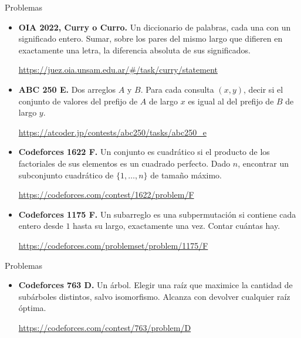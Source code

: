 \begin{frame}[fragile]{Problemas}
  \begin{itemize}
    \item \textbf{OIA 2022, Curry o Curro.}
      Un diccionario de palabras, cada una con un significado entero.
      Sumar, sobre los pares del mismo largo que difieren en exactamente una letra, la diferencia absoluta de sus significados.

      {\footnotesize \url{https://juez.oia.unsam.edu.ar/#/task/curry/statement}}

    \item \textbf{ABC 250 E.}
      Dos arreglos \(A\) y \(B\).
      Para cada consulta \((x, y)\), decir si el conjunto de valores del prefijo de \(A\) de largo \(x\) es igual al del prefijo de \(B\) de largo \(y\).

      {\footnotesize \url{https://atcoder.jp/contests/abc250/tasks/abc250_e}}

    \item \textbf{Codeforces 1622 F.}
      Un conjunto es cuadrático si el producto de los factoriales de sus elementos es un cuadrado perfecto.
      Dado \(n\), encontrar un subconjunto cuadrático de \(\{1,\ldots,n\}\) de tamaño máximo.

      {\footnotesize \url{https://codeforces.com/contest/1622/problem/F}}

    \item \textbf{Codeforces 1175 F.}
      Un subarreglo es una subpermutación si contiene cada entero desde \(1\) hasta su largo, exactamente una vez.
      Contar cuántas hay.

      {\footnotesize \url{https://codeforces.com/problemset/problem/1175/F}}
  \end{itemize}
\end{frame}

\begin{frame}{Problemas}
  \begin{itemize}
    \item \textbf{Codeforces 763 D.}
      Un árbol.
      Elegir una raíz que maximice la cantidad de subárboles distintos, salvo isomorfismo.
      Alcanza con devolver cualquier raíz óptima.

      {\footnotesize \url{https://codeforces.com/contest/763/problem/D}}
  \end{itemize}
\end{frame}

